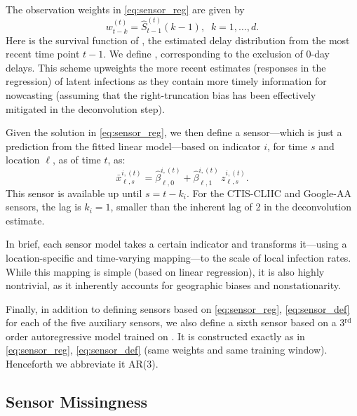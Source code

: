 \documentclass[sts]{imsart}
\def\hbeta{\hat{\beta}}
\def\hx{\hat{x}}
\def\hp{\hat{p}}
\def\hS{\hat{S}}
\def\bx{\bar{x}}
\def\rd{^\mathrm{rd}}
\theoremstyle{plain}
\theoremstyle{definition}
\theoremstyle{remark}
\begin{document}
The observation weights in \eqref{eq:sensor_reg} are given by
$$
w^{(t)}_{t-k} = \hS^{(t)}_{t-1}(k-1), \;\; k=1,\ldots,d.
$$ 
Here \smash{$\hS^{(t)}_{t-1}$} is the survival function of
\smash{$\hp^{(t)}_{t-1}$}, the estimated delay distribution from the most recent
time point $t-1$. We define \smash{$\hS^{(t)}_{t-1}(1) = 1$}, corresponding to 
the exclusion of 0-day delays. This scheme upweights the more recent estimates
(responses in the regression) of latent infections as they contain more timely
information for nowcasting (assuming that the right-truncation bias has been
effectively mitigated in the deconvolution step).

Given the solution \smash{$\hbeta^{i,(t)}_{\ell,0}, \hbeta^{i,(t)}_{\ell,1}$} in
\eqref{eq:sensor_reg}, we then define a sensor---which is just a prediction from
the fitted linear model---based on indicator $i$, for time $s$ and location
$\ell$, as of time $t$, as:
\begin{equation}
\label{eq:sensor_def}
\bx^{i,(t)}_{\ell,s} = \hbeta^{i,(t)}_{\ell,0} + \hbeta^{i,(t)}_{\ell,1} \,
z^{i,(t)}_{\ell,s}. 
\end{equation}
This sensor is available up until $s=t-k_i$. For the CTIS-CLIIC and Google-AA
sensors, the lag is $k_i=1$, smaller than the inherent lag of 2 in the
deconvolution estimate. 

In brief, each sensor model takes a certain indicator and transforms it---using
a location-specific and time-varying mapping---to the scale of local infection
rates. While this mapping is simple (based on linear regression), it is also
highly nontrivial, as it inherently accounts for geographic biases and
nonstationarity.

Finally, in addition to defining sensors based on \eqref{eq:sensor_reg},
\eqref{eq:sensor_def} for each of the five auxiliary sensors, we also define a
sixth sensor based on a 3$\rd$ order autoregressive model trained on
\smash{$\hx^{(t)}_\ell = (\hx^{(t)}_{\ell,s} : s < t)$}. It is constructed 
exactly as in \eqref{eq:sensor_reg}, \eqref{eq:sensor_def} (same weights and
same training window). Henceforth we abbreviate it AR(3). 

\subsection{Sensor Missingness}
\end{document}
